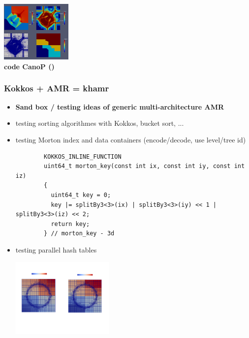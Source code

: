 \begin{frame}[fragile=singleslide]
\begin{minipage}{0.47\linewidth}
\begin{center}
      \includegraphics[height=3.0cm]{./images/canop/piecewise_const_prob3/piecewise_const_prob3_t0p8}\\
      {\bf code CanoP ()}
    \end{center}
  \end{minipage}
\end{frame}

\begin{frame}[fragile=singleslide]
  \frametitle{Kokkos + AMR = khamr}

  \begin{itemize}
  \item {\bf Sand box / testing ideas of generic multi-architecture AMR} %
  \item testing sorting algorithmes with Kokkos, bucket sort, ...
  \item testing Morton index and data containers (encode/decode, use level/tree id)
    {\scriptsize
      \begin{verbatim}
        KOKKOS_INLINE_FUNCTION
        uint64_t morton_key(const int ix, const int iy, const int iz)
        {
          uint64_t key = 0;
          key |= splitBy3<3>(ix) | splitBy3<3>(iy) << 1 | splitBy3<3>(iz) << 2;
          return key;
        } // morton_key - 3d
      \end{verbatim}
    }
  \item testing parallel hash tables
    \begin{center}
      \includegraphics[width=5cm]{images/khamr/khamr}
    \end{center}
  \end{itemize}

\end{frame}
